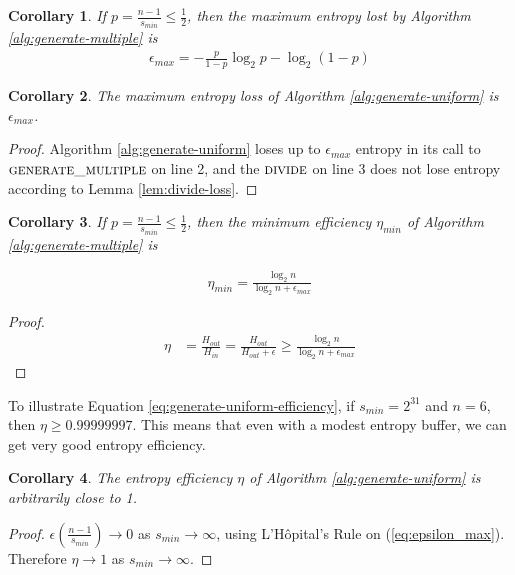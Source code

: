 \documentclass[12pt]{article}
\newtheorem{corollary}{Corollary}
\begin{document}
\begin{corollary}
    If $p = \frac{n-1}{s_{min}} \le \frac{1}{2}$, then the maximum entropy lost by Algorithm \ref{alg:generate-multiple} is
\begin{align}
    \label{eq:epsilon_max}
    \epsilon_{max} = -\frac{p}{1-p}\log_2p - \log_2(1-p)
\end{align}
\end{corollary}

\begin{corollary}
    The maximum entropy loss of Algorithm \ref{alg:generate-uniform} is $\epsilon_{max}$.
\end{corollary}

\begin{proof}
    Algorithm \ref{alg:generate-uniform} loses up to $\epsilon_{max}$ entropy in its call to $\textsc{generate\_multiple}$ on line 2, and the $\textsc{divide}$ on line 3 does not lose entropy according to Lemma \ref{lem:divide-loss}.
\end{proof}

\begin{corollary}
    If $p = \frac{n-1}{s_{min}} \le \frac{1}{2}$, then the minimum efficiency $\eta_{min}$ of Algorithm \ref{alg:generate-multiple} is 

\begin{align}
    \label{eq:generate-uniform-efficiency}
    \eta_{min} = \frac{\log_2n}{\log_2n + \epsilon_{max}}
\end{align}
\end{corollary}

\begin{proof}
\begin{align}
    \eta & = \frac{H_{out}}{H_{in}}
          = \frac{H_{out}}{H_{out}+\epsilon} 
          \ge \frac{\log_2n}{\log_2n + \epsilon_{max}}
\end{align}
\end{proof}

To illustrate Equation \ref{eq:generate-uniform-efficiency}, if $s_{min}=2^{31}$ and $n=6$, then $\eta \ge 0.99999997$. This means that even with a modest entropy buffer, we can get very good entropy efficiency.

\begin{corollary}
The entropy efficiency $\eta$ of Algorithm \ref{alg:generate-uniform} is arbitrarily close to 1.
\end{corollary}

\begin{proof}
$\epsilon(\frac{n-1}{s_{min}}) \rightarrow 0$ as $s_{min} \rightarrow \infty$, using L'H\^opital's Rule on (\ref{eq:epsilon_max}). Therefore $\eta \rightarrow 1$ as $s_{min} \rightarrow \infty$.
\end{proof}
\end{document}

